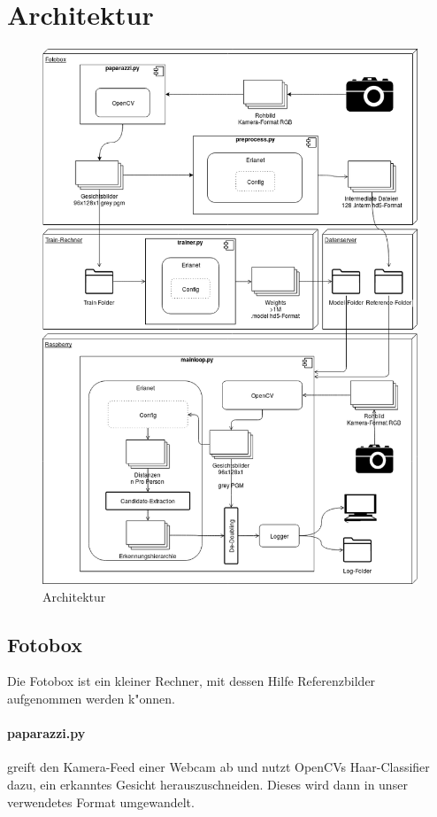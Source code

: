 \documentclass[12pt]{article}
\begin{document}
\section{Architektur}
\afterpage{\clearpage}
\begin{figure}[H]
    \includegraphics[height=0.9\textheight]{Architektur}
    \caption{Architektur}
\end{figure}

\subsection{Fotobox}
Die Fotobox ist ein kleiner Rechner,
mit dessen Hilfe Referenzbilder aufgenommen werden
k"onnen.
\paragraph{paparazzi.py}
greift den Kamera-Feed einer Webcam ab und nutzt
OpenCVs Haar-Classifier dazu, ein erkanntes Gesicht 
herauszuschneiden. Dieses wird dann in unser verwendetes
Format umgewandelt.
\end{document}
